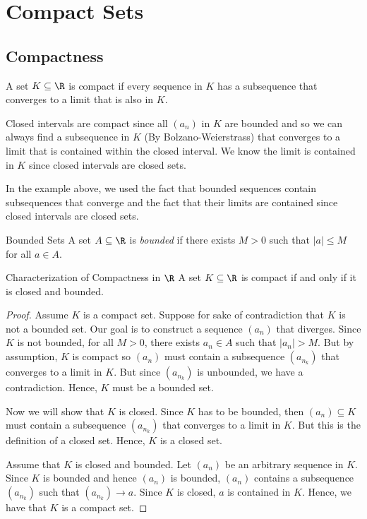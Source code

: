 
\section{Compact Sets}

\subsection{Compactness}
\begin{definition}{}{}
A set \( K \subseteq \R \) is compact if every sequence in \( K \) has a subsequence that converges to a limit that is also in \( K \).
\end{definition}

\begin{example}{}{}
    Closed intervals are compact since all \( (a_n) \) in \( K \) are bounded and so we can always find a subsequence in \( K \) (By Bolzano-Weierstrass) that converges to a limit that is contained within the closed interval. We know the limit is contained in \( K \) since closed intervals are closed sets. 
\end{example}

In the example above, we used the fact that bounded sequences contain subsequences that converge and the fact that their limits are contained since closed intervals are closed sets. 

\begin{definition}{Bounded Sets}{}
A set \( A \subseteq \R \) is \textit{bounded} if there exists \( M > 0  \) such that \( | a | \leq M  \) for all \( a \in A \).
\end{definition}

\begin{theorem}{Characterization of Compactness in \( \R \)}{}
    A set \( K \subseteq \R \) is compact if and only if it is closed and bounded.
    \end{theorem}

\begin{proof}
    Assume \( K \) is a compact set. Suppose for sake of contradiction that \( K \) is not a bounded set. Our goal is to construct a sequence \( (a_n) \) that diverges. Since \( K \) is not bounded, for all \( M > 0  \), there exists \( a_n \in A \) such that \( | a_n | > M  \). But by assumption, \( K \) is compact so \( (a_n) \) must contain a subsequence \( (a_{n_k}) \) that converges to a limit in \( K \). But since \( (a_{n_k}) \) is unbounded, we have a contradiction. Hence, \( K \) must be a bounded set. 

    Now we will show that \( K \) is closed. Since \( K \) has to be bounded, then \( (a_n) \subseteq K  \) must contain a subsequence \( (a_{n_k}) \) that converges to a limit in \( K \). But this is the definition of a closed set. Hence, \( K \) is a closed set.

    Assume that \( K \) is closed and bounded. Let \( (a_n) \) be an arbitrary sequence in \( K \). Since \( K  \) is bounded and hence \( (a_n) \) is bounded, \( (a_n) \) contains a subsequence \( (a_{n_k}) \) such that \( (a_{n_k}) \to a  \). Since \( K  \) is closed, \( a  \) is contained in \( K \). Hence, we have that \( K \) is a compact set.
\end{proof}

